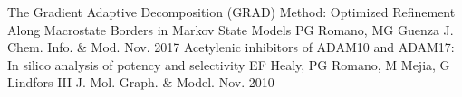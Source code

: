 \begin{cvpapers}
	\cvpaper
		{The Gradient Adaptive Decomposition (GRAD) Method: Optimized Refinement Along Macrostate Borders in Markov State Models}
		{PG Romano, MG Guenza}
		{J. Chem. Info. \& Mod.}
		{Nov. 2017}
	\cvpaper
		{Acetylenic inhibitors of ADAM10 and ADAM17: In silico analysis of potency and selectivity}
	    {EF Healy, PG Romano, M Mejia, G Lindfors III}
		{J. Mol. Graph. \& Model.}
	    {Nov. 2010}
\end{cvpapers}
